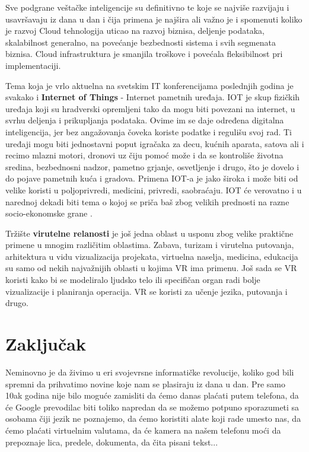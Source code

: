 \documentclass[a4paper]{article}
\begin{document}
{\begin{itemize}
		\end{itemize}
Sve podgrane veštačke inteligencije su definitivno te koje se najviše razvijaju i usavršavaju iz dana u dan i čija primena je najšira ali važno je i spomenuti koliko je razvoj Cloud tehnologija uticao na razvoj biznisa, deljenje podataka, skalabilnost generalno, na povećanje bezbednosti sistema i svih segmenata biznisa. Cloud infrastruktura je smanjila troškove i povećala fleksibilnost pri implementaciji.

Tema koja je vrlo aktuelna na svetskim IT konferencijama poslednjih godina je svakako i {\bf Internet of Things} - Internet pametnih uređaja. IOT je skup fizičkih uređaja koji su hradverski opremljeni tako da mogu biti povezani na internet, u svrhu deljenja i prikupljanja podataka. Ovime im se daje određena digitalna inteligencija, jer bez angažovanja čoveka koriste podatke i regulišu svoj rad. Ti uređaji mogu biti jednostavni poput igračaka za decu, kućnih aparata, satova ali i recimo mlazni motori, dronovi uz čiju pomoć može i da se kontroliše životna sredina, bezbednosni nadzor, pametno grjanje, osvetljenje i drugo, što je dovelo i do pojave pametnih kuća i gradova. Primena IOT-a je jako široka i može biti od velike koristi u poljoprivredi, medicini, privredi, saobraćaju. IOT će verovatno i u narednoj dekadi biti tema o kojoj se priča baš zbog velikih prednosti na razne socio-ekonomske grane \cite{iot}.

Tržište {\bf virutelne relanosti} je još jedna oblast u usponu zbog velike praktične primene u mnogim različitim oblastima. Zabava, turizam i virutelna putovanja, arhitektura u vidu vizualizacija projekata, virtuelna naselja, medicina, edukacija su samo od nekih najvažnijih oblasti u kojima VR ima primenu. Još sada se VR koristi kako bi se modeliralo ljudsko telo ili specifičan organ radi bolje vizualizacije i planiranja operacija. VR se koristi za učenje jezika, putovanja i drugo. 

\newpage
\section{Zaključak}
\label{Zaključak}

Neminovno je da živimo u eri svojevrsne informatičke revolucije, koliko god bili spremni da prihvatimo novine koje nam se plasiraju iz dana u dan. Pre samo 10ak godina nije bilo moguće zamisliti da ćemo danas plaćati putem telefona, da će Google prevodilac biti toliko napredan da se možemo potpuno sporazumeti sa osobama čiji jezik ne poznajemo, da ćemo koristiti alate koji rade umesto nas, da ćemo plaćati virtuelnim valutama, da će kamera na našem telefonu moći da prepoznaje lica, predele, dokumenta, da čita pisani tekst... 

}
\end{document}
